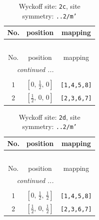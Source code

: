 \documentclass[fleqn,8pt]{jsarticle}
\begin{document}
\renewcommand{\arraystretch}{1.2}
\begin{longtable}{ccc}
\caption{Wyckoff site: {\tt 2c}, site symmetry: {\tt ..2/m'}}
 \\
 \hline \hline
No. & position & mapping \\ \hline \endfirsthead

\multicolumn{2}{l}{\tablename\ \thetable{}} \\
 \hline \hline
No. & position & mapping \\ \hline \endhead

 \hline \hline
\multicolumn{2}{r}{\footnotesize\it continued ...} \\ \endfoot

 \hline \hline
\multicolumn{2}{r}{} \\ \endlastfoot

1 & $\left[ 0,\, \frac{1}{2},\, 0 \right]$ & {\tt [1,4,5,8]} \\ \hline
2 & $\left[ \frac{1}{2},\, 0,\, 0 \right]$ & {\tt [2,3,6,7]} \\
\end{longtable}
\renewcommand{\arraystretch}{1.2}
\begin{longtable}{ccc}
\caption{Wyckoff site: {\tt 2d}, site symmetry: {\tt ..2/m'}}
 \\
 \hline \hline
No. & position & mapping \\ \hline \endfirsthead

\multicolumn{2}{l}{\tablename\ \thetable{}} \\
 \hline \hline
No. & position & mapping \\ \hline \endhead

 \hline \hline
\multicolumn{2}{r}{\footnotesize\it continued ...} \\ \endfoot

 \hline \hline
\multicolumn{2}{r}{} \\ \endlastfoot

1 & $\left[ 0,\, \frac{1}{2},\, \frac{1}{2} \right]$ & {\tt [1,4,5,8]} \\ \hline
2 & $\left[ \frac{1}{2},\, 0,\, \frac{1}{2} \right]$ & {\tt [2,3,6,7]} \\
\end{longtable}
\renewcommand{\arraystretch}{1.2}
\end{document}
